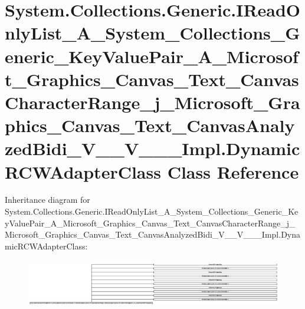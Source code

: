 \hypertarget{class_system_1_1_collections_1_1_generic_1_1_i_read_only_list___a___system___collections___gener34ff30f6c6f82400208624c2e473a445}{}\section{System.\+Collections.\+Generic.\+I\+Read\+Only\+List\+\_\+\+A\+\_\+\+System\+\_\+\+Collections\+\_\+\+Generic\+\_\+\+Key\+Value\+Pair\+\_\+\+A\+\_\+\+Microsoft\+\_\+\+Graphics\+\_\+\+Canvas\+\_\+\+Text\+\_\+\+Canvas\+Character\+Range\+\_\+j\+\_\+\+Microsoft\+\_\+\+Graphics\+\_\+\+Canvas\+\_\+\+Text\+\_\+\+Canvas\+Analyzed\+Bidi\+\_\+\+V\+\_\+\+\_\+\+V\+\_\+\+\_\+\+\_\+\+Impl.\+Dynamic\+R\+C\+W\+Adapter\+Class Class Reference}
\label{class_system_1_1_collections_1_1_generic_1_1_i_read_only_list___a___system___collections___gener34ff30f6c6f82400208624c2e473a445}
Inheritance diagram for System.\+Collections.\+Generic.\+I\+Read\+Only\+List\+\_\+\+A\+\_\+\+System\+\_\+\+Collections\+\_\+\+Generic\+\_\+\+Key\+Value\+Pair\+\_\+\+A\+\_\+\+Microsoft\+\_\+\+Graphics\+\_\+\+Canvas\+\_\+\+Text\+\_\+\+Canvas\+Character\+Range\+\_\+j\+\_\+\+Microsoft\+\_\+\+Graphics\+\_\+\+Canvas\+\_\+\+Text\+\_\+\+Canvas\+Analyzed\+Bidi\+\_\+\+V\+\_\+\+\_\+\+V\+\_\+\+\_\+\+\_\+\+Impl.\+Dynamic\+R\+C\+W\+Adapter\+Class\+:\begin{figure}[H]
\begin{center}
\leavevmode
\includegraphics[height=2.118294cm]{class_system_1_1_collections_1_1_generic_1_1_i_read_only_list___a___system___collections___gener34ff30f6c6f82400208624c2e473a445}
\end{center}
\end{figure}
